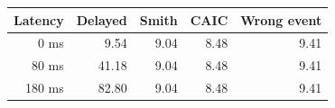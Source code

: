 \begin{tabular}{rrrrr}\toprule
Latency & Delayed & Smith & CAIC & Wrong event\\
\midrule
0 ms & 9.54 & 9.04 & 8.48 & 9.41\\
80 ms & 41.18 & 9.04 & 8.48 & 9.41\\
180 ms & 82.80 & 9.04 & 8.48 & 9.41\\
\bottomrule\end{tabular}

